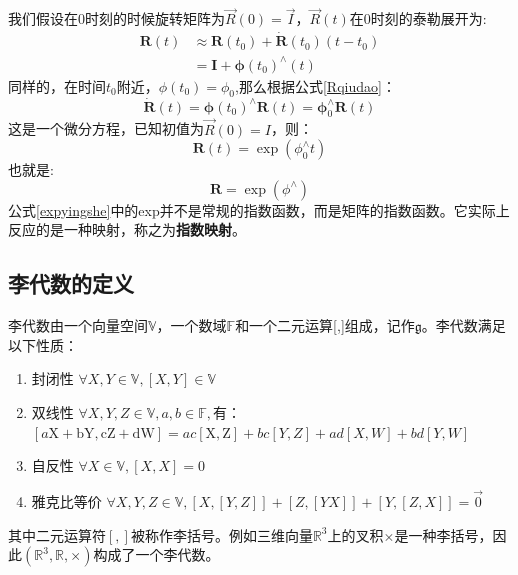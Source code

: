 我们假设在0时刻的时候旋转矩阵为$\vec{R}(0)=\vec{I}$，$\vec{R}(t)$在0时刻的泰勒展开为:
\begin{equation}
\begin{aligned} \boldsymbol{R}(t) & \approx \boldsymbol{R}\left(t_{0}\right)+\dot{\boldsymbol{R}}\left(t_{0}\right)\left(t-t_{0}\right) \\ &=\boldsymbol{I}+\boldsymbol{\phi}\left(t_{0}\right)^{\wedge}(t) \end{aligned}
\end{equation}
同样的，在时间$t_0$附近，$\phi(t_0)=\phi_0$,那么根据公式\ref{Rqiudao}：
\begin{equation}
\dot{\boldsymbol{R}}(t)=\boldsymbol{\phi}\left(t_{0}\right)^{\wedge} \boldsymbol{R}(t)=\boldsymbol{\phi}_{0}^{\wedge} \boldsymbol{R}(t)
\end{equation}
这是一个微分方程，已知初值为$\vec{R}(0)=I$，则：
\begin{equation}
\boldsymbol{R}(t)=\exp \left(\phi_{0}^{\wedge} t\right)
\end{equation}
也就是:
\begin{equation}
\boldsymbol{R}=\exp \left(\phi^{\wedge}\right)\label{expyingshe}
\end{equation}
公式\ref{expyingshe}中的exp并不是常规的指数函数，而是矩阵的指数函数。它实际上反应的是一种映射，称之为\textbf{指数映射}。
\subsection{李代数的定义}
李代数由一个向量空间$\mathbb{V}$，一个数域$\mathbb{F}$和一个二元运算[,]组成，记作$\mathfrak{g}$。李代数满足以下性质：
\begin{enumerate}
\item 封闭性 $\forall X, Y \in \mathbb{V},[X, Y] \in \mathbb{V}$
\item 双线性 $\forall X, Y, Z \in \mathbb{V}, a, b \in \mathbb{F},$有：\\
$[a \mathrm{X}+\mathrm{bY}, \mathrm{cZ}+\mathrm{d} \mathrm{W}]=a c[\mathrm{X}, \mathrm{Z}]+b c[Y, Z]+a d[X, W]+b d[Y, W]$
\item 自反性 $\forall X \in \mathbb{V},[X, X]=0$
\item 雅克比等价 $\forall X, Y, Z \in \mathbb{V},[X,[Y,Z]]+[Z,[Y X]]+[Y,[Z,X]]=\vec{0}$
\end{enumerate}
其中二元运算符$[,]$被称作李括号。例如三维向量$\mathbb{R}^3$上的叉积$\times$是一种李括号，因此$(\mathbb{R}^3,\mathbb{R},\times)$构成了一个李代数。
